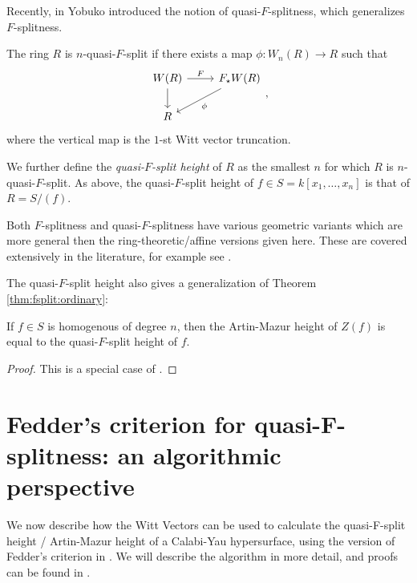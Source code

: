 Recently, in \cite{yobuko-2019-qfs-calabi-yau}
Yobuko introduced the notion of 
quasi-\(F\)-splitness, which generalizes \(F\)-splitness.

\begin{defn}
	The ring \(R\) is \(n\)-quasi-\(F\)-split if there exists
	a map \(\phi \colon W_{n}(R) \xrightarrow{} R\) such that
	\[
	\begin{tikzcd}
		W(R) \arrow{r}{F} \arrow{d}[swap]{} &
		F_{\star}W(R) \arrow{ld}{\phi} \\
	R 
	\end{tikzcd}
	,\]
	where the vertical map is the \(1\)-st Witt vector truncation.
\end{defn}

We further define the \textit{quasi-\(F\)-split height} of \(R\) as the smallest \(n\) 
for which \(R\) is \(n\)-quasi-\(F\)-split.
As above, the quasi-\(F\)-split height of 
\(f \in S = k[x_{1}, \ldots, x_{n}]\) is that
of \(R = S / (f)\).

\begin{rmk}
	Both \(F\)-splitness and quasi-\(F\)-splitness have 
	various geometric
	variants which are more general then the 
	ring-theoretic/affine versions given here. 
	These are covered extensively in the literature, for example
	see \cite{kttwyy-2022-qfs-birat}.
\end{rmk}

The quasi-\(F\)-split height also gives a generalization
of Theorem \ref{thm:fsplit:ordinary}:

\begin{thm}
	If \(f \in S\) is homogenous of degree \(n\),
	then the Artin-Mazur height of \(Z(f)\)
	is equal to the quasi-\(F\)-split height
	of \(f\).
\end{thm}

\begin{proof}
	This is a special case of 
	\cite[Theorem~4.5]{yobuko-2019-qfs-calabi-yau}.
\end{proof}

\section{Fedder's criterion for quasi-F-splitness: an algorithmic perspective}

We now describe how the Witt Vectors can be used to calculate the 
quasi-F-split height / Artin-Mazur height of a Calabi-Yau 
hypersurface, using the version of Fedder's criterion in \cite{kty-2022-fedder}.
We will describe the algorithm in more detail, and proofs can be
found in \cite{kty-2022-fedder}.

